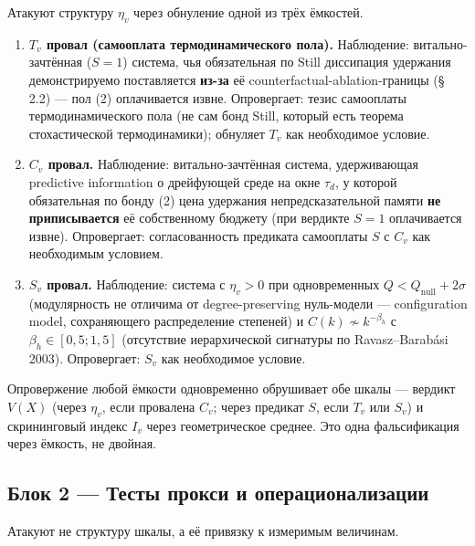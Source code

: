 \documentclass[pdflatex,sn-mathphys-ay]{sn-jnl}
\providecommand{\tightlist}{\setlength{\itemsep}{0pt}\setlength{\parskip}{0pt}}
\begin{document}
Атакуют структуру \(\eta_v\) через обнуление одной из трёх ёмкостей.

\begin{enumerate}
\def\labelenumi{\arabic{enumi}.}
\tightlist
\item
  \textbf{\(T_v\) провал (самооплата термодинамического пола).} Наблюдение: витально-зачтённая (\(S = 1\)) система, чья обязательная по Still диссипация удержания демонстрируемо поставляется \textbf{из-за} её counterfactual-ablation-границы (§ 2.2) --- пол (2) оплачивается извне. Опровергает: тезис самооплаты термодинамического пола (не сам бонд Still, который есть теорема стохастической термодинамики); обнуляет \(T_v\) как необходимое условие.
\item
  \textbf{\(C_v\) провал.} Наблюдение: витально-зачтённая система, удерживающая predictive information о дрейфующей среде на окне \(\tau_d\), у которой обязательная по бонду (2) цена удержания непредсказательной памяти \textbf{не приписывается} её собственному бюджету (при вердикте \(S = 1\) оплачивается извне). Опровергает: согласованность предиката самооплаты \(S\) с \(C_v\) как необходимым условием.
\item
  \textbf{\(S_v\) провал.} Наблюдение: система с \(\eta_v > 0\) при одновременных \(Q < Q_{\text{null}} + 2\sigma\) (модулярность не отличима от degree-preserving нуль-модели --- configuration model, сохраняющего распределение степеней) и \(C(k) \not\sim k^{-\beta_h}\) с \(\beta_h \in [0{,}5; 1{,}5]\) (отсутствие иерархической сигнатуры по Ravasz--Barabási 2003). Опровергает: \(S_v\) как необходимое условие.
\end{enumerate}

Опровержение любой ёмкости одновременно обрушивает обе шкалы --- вердикт \(V(X)\) (через \(\eta_v\), если провалена \(C_v\); через предикат \(S\), если \(T_v\) или \(S_v\)) и скрининговый индекс \(I_v\) через геометрическое среднее. Это одна фальсификация через ёмкость, не двойная.

\subsection{Блок 2 --- Тесты прокси и операционализации}\label{ux431ux43bux43eux43a-2-ux442ux435ux441ux442ux44b-ux43fux440ux43eux43aux441ux438-ux438-ux43eux43fux435ux440ux430ux446ux438ux43eux43dux430ux43bux438ux437ux430ux446ux438ux438}

Атакуют не структуру шкалы, а её привязку к измеримым величинам.
\end{document}
